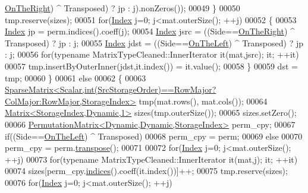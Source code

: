 \begin{DoxyCode}
      \hyperlink{group__enums_ggac22de43beeac7a78b384f99bed5cee0ba99dc75d8e00b6c3a5bdc31940f47492b}{OnTheRight}) ^ Transposed) ? jp : j).nonZeros());
00049         \}
00050         tmp.reserve(sizes);
00051         \textcolor{keywordflow}{for}(\hyperlink{namespace_eigen_a62e77e0933482dafde8fe197d9a2cfde}{Index} j=0; j<mat.outerSize(); ++j)
00052         \{
00053           \hyperlink{namespace_eigen_a62e77e0933482dafde8fe197d9a2cfde}{Index} jp = perm.indices().coeff(j);
00054           \hyperlink{namespace_eigen_a62e77e0933482dafde8fe197d9a2cfde}{Index} jsrc = ((Side==\hyperlink{group__enums_ggac22de43beeac7a78b384f99bed5cee0ba99dc75d8e00b6c3a5bdc31940f47492b}{OnTheRight}) ^ Transposed) ? jp : j;
00055           \hyperlink{namespace_eigen_a62e77e0933482dafde8fe197d9a2cfde}{Index} jdst = ((Side==\hyperlink{group__enums_ggac22de43beeac7a78b384f99bed5cee0ba129609b3bdf23b071f5f86cf2f995ec4}{OnTheLeft}) ^ Transposed) ? jp : j;
00056           \textcolor{keywordflow}{for}(\textcolor{keyword}{typename} MatrixTypeCleaned::InnerIterator it(mat,jsrc); it; ++it)
00057             tmp.insertByOuterInner(jdst,it.index()) = it.value();
00058         \}
00059         dst = tmp;
00060       \}
00061       \textcolor{keywordflow}{else}
00062       \{
00063         
      \hyperlink{group___sparse_core___module_class_eigen_1_1_sparse_matrix}{SparseMatrix<Scalar,int(SrcStorageOrder)==RowMajor?ColMajor:RowMajor,StorageIndex>}
       tmp(mat.rows(), mat.cols());
00064         \hyperlink{group___core___module}{Matrix<StorageIndex,Dynamic,1>} sizes(tmp.outerSize());
00065         sizes.setZero();
00066         \hyperlink{group___core___module}{PermutationMatrix<Dynamic,Dynamic,StorageIndex>} 
      perm\_cpy;
00067         \textcolor{keywordflow}{if}((Side==\hyperlink{group__enums_ggac22de43beeac7a78b384f99bed5cee0ba129609b3bdf23b071f5f86cf2f995ec4}{OnTheLeft}) ^ Transposed)
00068           perm\_cpy = perm;
00069         \textcolor{keywordflow}{else}
00070           perm\_cpy = perm.\hyperlink{group___core___module_a05805e9f4182eec3f6632e1c765b5ffe}{transpose}();
00071 
00072         \textcolor{keywordflow}{for}(\hyperlink{namespace_eigen_a62e77e0933482dafde8fe197d9a2cfde}{Index} j=0; j<mat.outerSize(); ++j)
00073           \textcolor{keywordflow}{for}(\textcolor{keyword}{typename} MatrixTypeCleaned::InnerIterator it(mat,j); it; ++it)
00074             sizes[perm\_cpy.\hyperlink{group___core___module_a2f1ab379207fcd1ceb33941e25cf50c2}{indices}().coeff(it.index())]++;
00075         tmp.reserve(sizes);
00076         \textcolor{keywordflow}{for}(\hyperlink{namespace_eigen_a62e77e0933482dafde8fe197d9a2cfde}{Index} j=0; j<mat.outerSize(); ++j)

\end{DoxyCode}
